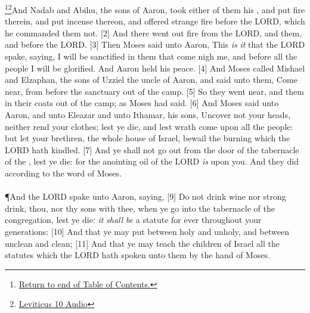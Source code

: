 \footnote{\textcolor[cmyk]{0.99998,1,0,0}{\hyperlink{TOC}{Return to end of Table of Contents.}}}\footnote{\href{https://audiobible.com/bible/leviticus_10.html}{\textcolor[cmyk]{0.99998,1,0,0}{Leviticus 10 Audio}}}\textcolor[cmyk]{0.99998,1,0,0}{And Nadab and Abihu, the sons of Aaron, took either of them his , and put fire therein, and put incense thereon, and offered strange fire before the LORD, which he commanded them not.}
[2] \textcolor[cmyk]{0.99998,1,0,0}{And there went out fire from the LORD, and  them, and  before the LORD.}
[3] \textcolor[cmyk]{0.99998,1,0,0}{Then Moses said unto Aaron, This \emph{is} \emph{it} that the LORD spake, saying, I will be sanctified in them that come nigh me, and before all the people I will be glorified. And Aaron held his peace.}
[4] \textcolor[cmyk]{0.99998,1,0,0}{And Moses called Mishael and Elzaphan, the sons of Uzziel the uncle of Aaron, and said unto them, Come near,  from before the sanctuary out of the camp.}
[5] \textcolor[cmyk]{0.99998,1,0,0}{So they went near, and  them in their coats out of the camp; as Moses had said.}
[6] \textcolor[cmyk]{0.99998,1,0,0}{And Moses said unto Aaron, and unto Eleazar and unto Ithamar, his sons, Uncover not your heads, neither rend your clothes; lest ye die, and lest wrath come upon all the people: but let your brethren, the whole house of Israel, bewail the burning which the LORD hath kindled.}
[7] \textcolor[cmyk]{0.99998,1,0,0}{And ye shall not go out from the door of the tabernacle of the , lest ye die: for the anointing oil of the LORD \emph{is} upon you. And they did according to the word of Moses.}\\
\\
\P \textcolor[cmyk]{0.99998,1,0,0}{And the LORD spake unto Aaron, saying,}
[9] \textcolor[cmyk]{0.99998,1,0,0}{Do not drink wine nor strong drink, thou, nor thy sons with thee, when ye go into the tabernacle of the congregation, lest ye die: \emph{it} \emph{shall} \emph{be} a statute for ever throughout your generations:}
[10] \textcolor[cmyk]{0.99998,1,0,0}{And that ye may put  between holy and unholy, and between unclean and clean;}
[11] \textcolor[cmyk]{0.99998,1,0,0}{And that ye may teach the children of Israel all the statutes which the LORD hath spoken unto them by the hand of Moses.}\\
